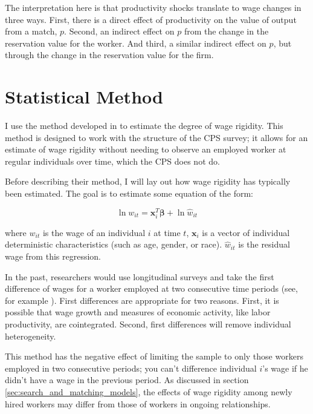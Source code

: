 \documentclass[11pt]{article}
\begin{document}
The interpretation here is that productivity shocks translate to wage changes in three ways.
First, there is a direct effect of productivity on the value of output from a match, $p$.
Second, an indirect effect on $p$ from the change in the reservation value for the worker.
And third, a similar indirect effect on $p$, but through the change in the reservation value for the firm.

\section{Statistical Method}
\label{sec:statistical_method}

I use the method developed in \cite{haefke_sonntag_vanRens_2013} to estimate the degree of wage rigidity.
This method is designed to work with the structure of the CPS survey;
it allows for an estimate of wage rigidity without needing to observe an employed worker at regular individuals over time, which the CPS does not do.

Before describing their method, I will lay out how wage rigidity has typically been estimated.
The goal is to estimate some equation of the form:

\begin{equation}
    \label{eq:individual_wage}
    \ln w_{it} = \boldsymbol{x}_i^{T} \boldsymbol{\beta} + \ln \hat{w}_{it}
\end{equation}

where $w_{it}$ is the wage of an individual $i$ at time $t$, $\boldsymbol{x}_i$ is a vector of individual deterministic characteristics (such as age, gender, or race). $\hat{w}_{it}$ is the residual wage from this regression.

In the past, researchers would use longitudinal surveys and take the first difference of wages for a worker employed at two consecutive time periods (see, for example \citep{bils_1985}).
First differences are appropriate for two reasons.
First, it is possible that wage growth and measures of economic activity, like labor productivity, are cointegrated.
Second, first differences will remove individual heterogeneity.

This method has the negative effect of limiting the sample to only those workers employed in two consecutive periods;
you can't difference individual $i$'s wage if he didn't have a wage in the previous period.
As discussed in section \autoref{sec:search_and_matching_models}, the effects of wage rigidity among newly hired workers may differ from those of workers in ongoing relationships.
\end{document}
